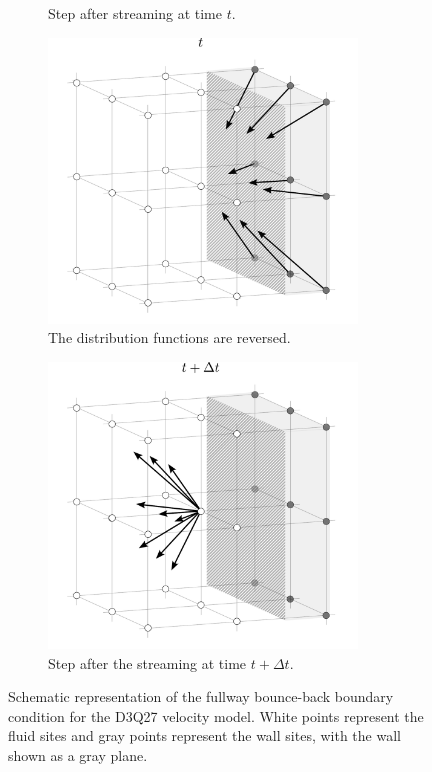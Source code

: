 \begin{figure}[h]
\begin{subfigure}{0.48\textwidth}
		\caption{Step after streaming at time $t$.}
		\label{fig:bbb}
	\end{subfigure}
	\par\bigskip
	\par\bigskip
	\begin{subfigure}{0.48\textwidth}
		\centering
		\includegraphics[width=0.9\textwidth, trim={0mm 0mm 0mm 0mm}]{figures/fwbbc.pdf}
		\caption{The distribution functions are reversed.}
		\label{fig:bbc}
	\end{subfigure}
	\begin{subfigure}{0.48\textwidth}
		\centering
		\includegraphics[width=0.9\textwidth, trim={0mm 0mm 0mm 0mm}]{figures/fwbbd.pdf}
		\caption{Step after the streaming at time $t + \Delta t$.}
		\label{fig:bbd}
	\end{subfigure}
	
	\caption{Schematic representation of the fullway bounce-back boundary condition for the D3Q27 velocity model. White points represent the fluid sites and gray points represent the wall sites, with the wall shown as a gray plane.}
	\label{fig:fbb}
\end{figure}


